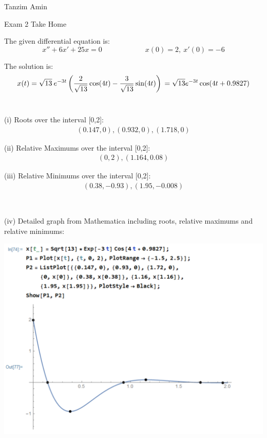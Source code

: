 \documentclass[10pt,a4paper]{article}
\begin{document}
\hfill Tanzim Amin

\hfill Exam 2 Take Home
\\


\item The given differential equation is:\\
\begin{equation}
x''+6x'+25x=0 \qquad \qquad \qquad x(0)=2,\:x'(0)=-6
\end{equation}


\item The solution is:\\

\begin{equation}
x(t)=\sqrt{13}\:e^{-3t}\\
\left(\frac{2}{\sqrt{13}}\cos({4t})-\frac{3}{\sqrt{13}}\sin({4t})\right)\\
= \sqrt{13} e^{-3t}\cos({4t+0.9827})
\end{equation}
\\

\item \: (i) Roots over the interval [0,2]:
\begin{align}
    (0.147,0),(0.932,0),(1.718,0)
\end{align}


\item \: (ii) Relative Maximums over the interval [0,2]:
\begin{align}
    (0,2),(1.164,0.08)
\end{align}


\item \: (iii) Relative Minimums over the interval [0,2]:
\begin{align}
    (0.38,-0.93),(1.95,-0.008)
\end{align}

\\
\item \: (iv) Detailed graph from Mathematica including roots, relative maximums and relative minimums:
\\

\begin{center}
\includegraphics[scale=0.7]{Exam2Graph.PNG}
\end{center}
\end{document}
